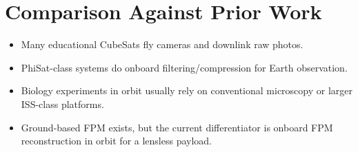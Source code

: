 \section{Comparison Against Prior Work}

\begin{itemize}[leftmargin=1.5em]
    \item Many educational CubeSats fly cameras and downlink raw photos.
    \item PhiSat-class systems do onboard filtering/compression for Earth observation.
    \item Biology experiments in orbit usually rely on conventional microscopy or larger ISS-class platforms.
    \item Ground-based FPM exists, but the current differentiator is onboard FPM reconstruction in orbit for a lensless payload.
\end{itemize}
